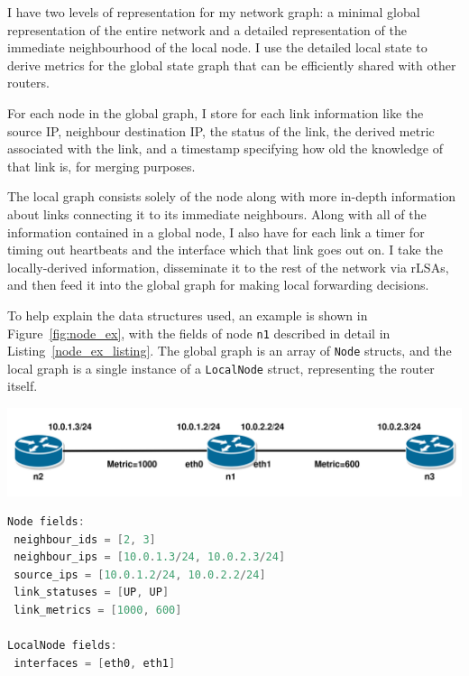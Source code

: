 \documentclass[withindex,glossary,openany]{cam-thesis}
\begin{document}
I have two levels of representation for my network graph: a minimal global representation of the entire network and a detailed representation of the immediate neighbourhood of the local node. I use the detailed local state to derive metrics for the global state graph that can be efficiently shared with other routers.

For each node in the global graph, I store for each link information like the source IP, neighbour destination IP, the status of the link, the derived metric associated with the link, and a timestamp specifying how old the knowledge of that link is, for merging purposes.

The local graph consists solely of the node along with more in-depth information about links connecting it to its immediate neighbours. Along with all of the information contained in a global node, I also have for each link a timer for timing out heartbeats and the interface which that link goes out on. I take the locally-derived information, disseminate it to the rest of the network via rLSAs, and then feed it into the global graph for making local forwarding decisions.

To help explain the data structures used, an example is shown in Figure~\ref{fig:node_ex}, with the fields of node \texttt{n1} described in detail in Listing~\ref{node_ex_listing}. The global graph is an array of \texttt{Node} structs, and the local graph is a single instance of a \texttt{LocalNode} struct, representing the router itself.

\begin{center}
\begin{minipage}{0.9\textwidth} \centering
	\includegraphics[width=1\textwidth]{node}
	\label{fig:node_ex}
\end{minipage}
\end{center}

\begin{minipage}{1\textwidth} \centering
\begin{lstlisting}[language=C, label=node_ex_listing, frame=tb, columns=fullflexible, caption=Partial example of fields of \texttt{Node} and \texttt{LocalNode}]
Node fields:
 neighbour_ids = [2, 3]
 neighbour_ips = [10.0.1.3/24, 10.0.2.3/24]
 source_ips = [10.0.1.2/24, 10.0.2.2/24]
 link_statuses = [UP, UP]
 link_metrics = [1000, 600]

LocalNode fields:
 interfaces = [eth0, eth1]
\end{lstlisting}
\end{minipage}
\end{document}
